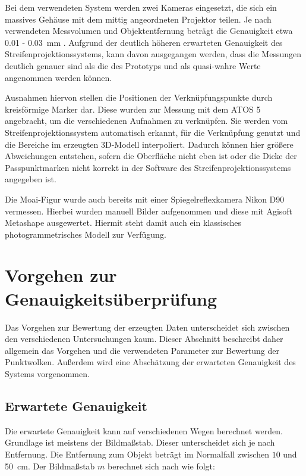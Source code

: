 \documentclass[./00PhotoBox.tex]{subfiles}
\begin{document}
Bei dem verwendeten System werden zwei Kameras eingesetzt, die sich ein massives Gehäuse mit dem mittig angeordneten Projektor teilen. Je nach verwendeten Messvolumen und Objektentfernung beträgt die Genauigkeit etwa \SI{0,01}{} - \SI{0,03}{\milli\metre} \citep{atos}. Aufgrund der deutlich höheren erwarteten Genauigkeit des Streifenprojektionssystems, kann davon ausgegangen werden, dass die Messungen deutlich genauer sind als die des Prototyps und als quasi-wahre Werte angenommen werden können.

Ausnahmen hiervon stellen die Positionen der Verknüpfungspunkte durch kreisförmige Marker dar. Diese wurden zur Messung mit dem ATOS 5 angebracht, um die verschiedenen Aufnahmen zu verknüpfen. Sie werden vom Streifenprojektionssystem au\-to\-ma\-tisch erkannt, für die Verknüpfung genutzt und die Bereiche im erzeugten 3D-Modell interpoliert. Dadurch können hier größere Abweichungen entstehen, sofern die Oberfläche nicht eben ist oder die Dicke der Passpunktmarken nicht korrekt in der Software des Streifenprojektionssystems angegeben ist.

Die Moai-Figur wurde auch bereits mit einer Spiegelreflexkamera Nikon D90 vermessen. Hierbei wurden manuell Bilder aufgenommen und diese mit Agisoft Metashape ausgewertet. Hiermit steht damit auch ein klassisches photogrammetrisches Modell zur Verfügung.


\section{Vorgehen zur Genauigkeitsüberprüfung}

Das Vorgehen zur Bewertung der erzeugten Daten unterscheidet sich zwischen den verschiedenen Untersuchungen kaum. Dieser Abschnitt beschreibt daher allgemein das Vorgehen und die verwendeten Parameter zur Bewertung der Punktwolken. Außerdem wird eine Abschätzung der erwarteten Genauigkeit des Systems vorgenommen.


\subsection{Erwartete Genauigkeit}
\label{ss:erwartete_genauigkeit}
Die erwartete Genauigkeit kann auf verschiedenen Wegen berechnet werden. Grundlage ist meistens der Bildmaßstab. Dieser unterscheidet sich je nach Entfernung. Die Entfernung zum Objekt beträgt im Normalfall zwischen $10$ und \SI{50}{\centi\metre}. Der Bildmaßstab $m$ berechnet sich nach \citet[S. 171]{luhmann} wie folgt:
\end{document}
